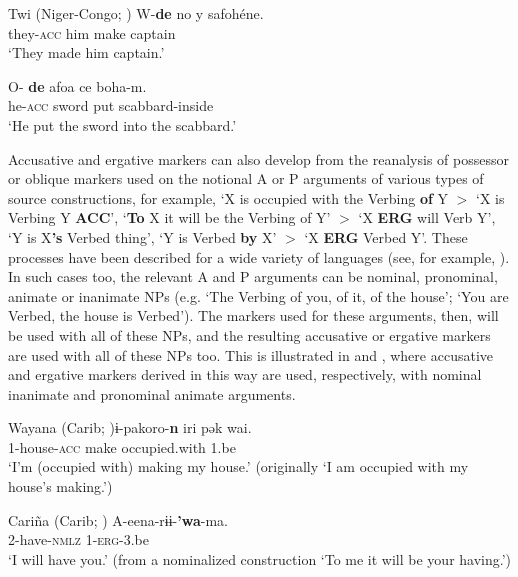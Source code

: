 \documentclass[output=paper]{langsci/langscibook}
\begin{document}
\ea\label{twi}
Twi (Niger-Congo; )
\ea
\gll W{}-\textbf{{de}} no y{}{} {}safohéne.\\
they-\textsc{acc} him make captain\\
\glt `They made him captain.' 

\ex
\gll O-\textbf{{ de}} afoa ce boha-m.\\
he-\textsc{acc} sword put scabbard-inside\\
\glt `He put the sword into the scabbard.' 

\z
\z



Accusative and ergative markers  can  also develop from the
  reanalysis of possessor or oblique markers used on the notional A or
  P arguments of various types of source constructions, for example,
  `X is occupied with the Verbing  {\bf of} Y $>$ `X
        is Verbing Y {\bf ACC}', `{\bf To} X it will be the Verbing
        of Y' $>$ `X {\bf ERG} 
        will Verb Y',  `Y is X{\bf 's} Verbed thing', `Y is
        Verbed {\bf by} X'
        $>$ `X {\bf ERG} Verbed Y'. These processes have been described for
        a wide variety of languages (see, for example,
     \citealt{HarrisCampbell1995,Bubenik1998,Gildea1998,Creissels2008}). In such cases
        too,  the relevant A and P arguments can be nominal,
        pronominal, animate or inanimate NPs (e.g. `The Verbing of
        you, of it, of the house'; `You are Verbed, the house is
        Verbed'). The  markers used for these arguments, then,  will
        be used with all of these NPs, and the resulting accusative or
        ergative markers are used with all of these NPs too. This is
        illustrated in  and , where accusative and
        ergative markers derived in this way are used, respectively,
        with nominal inanimate and pronominal animate arguments.

\ea\label{wayana}
Wayana (Carib;  )
\gll ​ɨ-pakoro-\textbf{{n}} iri pək wai.\\
1-house-\textsc{acc} make occupied.with 1.be\\
\glt `I'm (occupied with) making my house.' (originally `I am occupied with my house's making.')

\z

\ea\label{carina}
Cari\~na (Carib;  )
\gll A-eena-r​ɨ ​ɨ-\textbf{{'wa}}-ma.\\
2-have-\textsc{nmlz} 1-\textsc{erg}-3.be\\
\glt `I will have you.' (from a nominalized construction `To me it will be your having.')
\end{document}

